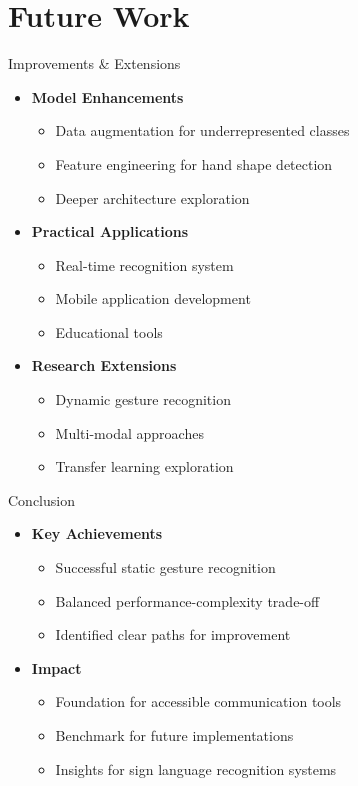 \documentclass{beamer}
\begin{document}
\section{Future Work}

\begin{frame}{Improvements \& Extensions}
    \begin{itemize}
        \item \textbf{Model Enhancements}
        \begin{itemize}
            \item Data augmentation for underrepresented classes
            \item Feature engineering for hand shape detection
            \item Deeper architecture exploration
        \end{itemize}
        \item \textbf{Practical Applications}
        \begin{itemize}
            \item Real-time recognition system
            \item Mobile application development
            \item Educational tools
        \end{itemize}
        \item \textbf{Research Extensions}
        \begin{itemize}
            \item Dynamic gesture recognition
            \item Multi-modal approaches
            \item Transfer learning exploration
        \end{itemize}
    \end{itemize}
\end{frame}

\begin{frame}{Conclusion}
    \begin{itemize}
        \item \textbf{Key Achievements}
        \begin{itemize}
            \item Successful static gesture recognition
            \item Balanced performance-complexity trade-off
            \item Identified clear paths for improvement
        \end{itemize}
        \item \textbf{Impact}
        \begin{itemize}
            \item Foundation for accessible communication tools
            \item Benchmark for future implementations
            \item Insights for sign language recognition systems
        \end{itemize}
    \end{itemize}
\end{frame}
\end{document}
